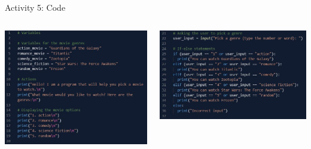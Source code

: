 \documentclass[hyperref={pdfpagemode=FullScreen},aspectratio=169]{beamer}
\begin{document}
  \begin{frame}{Activity 5: Code}
    \begin{columns}[c]
      \begin{column}{0.45\textwidth}
        \begin{center}
          \includegraphics[scale=0.5]{./imgs/activityFiveCodePart1.jpg}
        \end{center}
      \end{column}

      \hfill

      \begin{column}{0.45\textwidth}
        \begin{center}
          \includegraphics[scale=0.45]{./imgs/activityFiveCodePart2.jpg}
        \end{center}
      \end{column}
    \end{columns}
  \end{frame}
\end{document}
